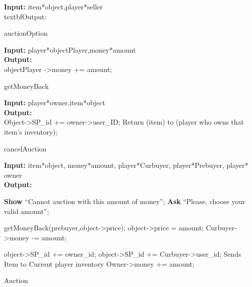 \documentclass[a4paper]{article}
\begin{document}
\begin{algorithm}
 \textbf{Input:} item*object,player*seller\\
 textbf{Output:}\\
 
    \EndIf
    
 \caption{auctionOption}
\end{algorithm}
    
\begin{algorithm}
 \textbf{Input:} player*objectPlayer,money*amount\\
  \textbf{Output:}\\
    \State objectPlayer ->money += amount;
    
    \caption{getMoneyBack}
\end{algorithm}

\begin{algorithm}
\textbf{Input:}  player*owner,item*object\\
\textbf{Output:}\\
    \State Object->SP\_id += owner->user\_ID;
	\State Return (item) to (player who owns that item’s inventory);
\caption{cancelAuction}
\end{algorithm}

\begin{algorithm}
\textbf{Input:} item*object, money*amount, player*Curbuyer, player*Prebuyer, player* owner\\
\textbf{Output:}\\
    {
        {
            \State \textbf{Show}  “Cannot auction with this amount of money”;
            \State \textbf{Ask} “Please, choose your valid amount”;
        }
        
        \Else
        {
            \State getMoneyBack(prebuyer,object->price);
			\State object->price = amount;
			\State Curbuyer->money -= amount;
        }
    }
    \Else
    {
        {
            \State object->SP\_id += owner\_id;
        }
        \Else
        {
            \State object->SP\_id += Curbuyer->user\_id;
			\State Sends Item to Current player inventory	
			\State Owner->money += amount;
        }
    }
\caption{Auction}
\end{algorithm}
\end{document}
